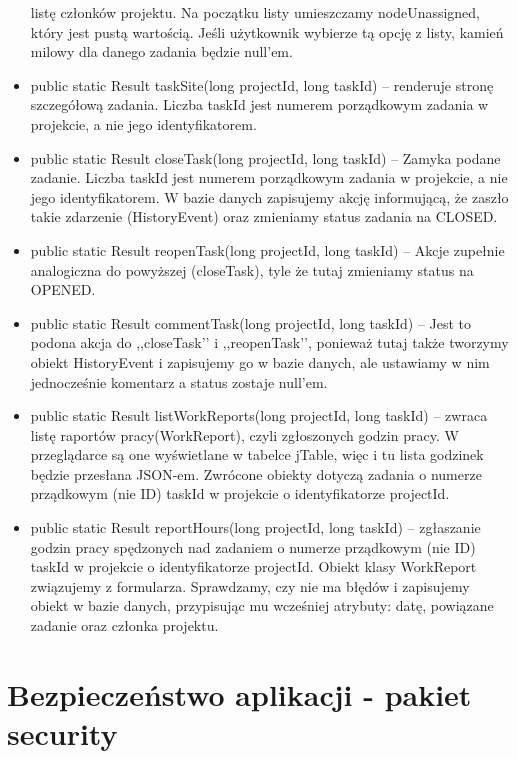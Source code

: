 \documentclass[a4paper,12pt,notitlepage]{mwrep}
\begin{document}
\begin{itemize}
    listę członków projektu. Na początku listy umieszczamy nodeUnassigned,
który jest pustą wartością. Jeśli użytkownik wybierze tą opcję z listy,
kamień milowy dla danego zadania będzie null’em.
\item    public static Result taskSite(long projectId, long taskId) -- renderuje
    stronę szczegółową zadania. Liczba taskId jest numerem porządkowym
    zadania w projekcie, a nie jego identyfikatorem.
\item    public static Result closeTask(long projectId, long taskId) -- Zamyka podane
    zadanie. Liczba taskId jest numerem porządkowym zadania w projekcie,
a nie jego identyfikatorem. W bazie danych zapisujemy akcję informującą,
że zaszło takie zdarzenie (HistoryEvent) oraz zmieniamy status zadania na
CLOSED.
\item    public static Result reopenTask(long projectId, long taskId) -- Akcje zupełnie
    analogiczna do powyższej (closeTask), tyle że tutaj zmieniamy status
    na OPENED.
\item    public static Result commentTask(long projectId, long taskId) -- Jest to podona
    akcja do ,,closeTask’’ i ,,reopenTask’’, ponieważ tutaj także tworzymy obiekt
    HistoryEvent i zapisujemy go w bazie danych, ale ustawiamy w nim
jednocześnie komentarz a status zostaje null’em.
\item    public static Result listWorkReports(long projectId, long taskId) -- zwraca listę
    raportów pracy(WorkReport), czyli zgłoszonych godzin pracy. W przeglądarce
    są one wyświetlane w tabelce jTable, więc i tu lista godzinek będzie przesłana
    JSON-em. Zwrócone obiekty dotyczą zadania o numerze prządkowym (nie
    ID) taskId w projekcie o identyfikatorze projectId.
\item    public static Result reportHours(long projectId, long taskId) -- zgłaszanie
    godzin pracy spędzonych nad zadaniem o numerze prządkowym (nie
    ID) taskId w projekcie o identyfikatorze projectId. Obiekt klasy WorkReport
    związujemy z formularza. Sprawdzamy, czy nie ma błędów i zapisujemy
    obiekt w bazie danych, przypisując mu wcześniej atrybuty: datę, powiązane
    zadanie oraz członka projektu.
\end{itemize}




\section{Bezpieczeństwo aplikacji - pakiet security}
\end{document}
